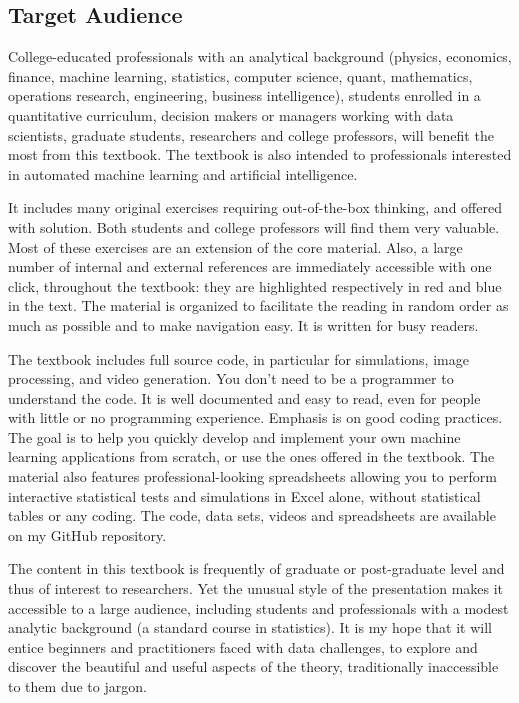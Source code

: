 \documentclass[10pt]{article}
\begin{document}
\subsection*{Target Audience}

College-educated professionals with an analytical background (physics, economics, finance, machine learning, statistics, computer science, quant, mathematics, operations research, engineering, business intelligence), students enrolled in a quantitative curriculum, decision makers or managers working with data scientists, graduate students, researchers and college professors, will benefit the most from this textbook. The textbook is also intended to professionals interested in automated machine learning and artificial intelligence.

It includes many original exercises requiring out-of-the-box thinking, and offered with solution. Both students and college professors will find them very valuable. Most of these exercises are an extension  of the core material.  Also, a large number of internal and external references are immediately accessible with one click, throughout the textbook: they are highlighted respectively in red and blue in the text. The material is organized to facilitate the reading in random order as much as possible and to make navigation easy. It is written for busy readers.

The textbook includes full source code, in particular for simulations, image processing, and video generation. You don't need to be a programmer to understand the code. It is well documented and easy to read, even for people with little or no programming experience. Emphasis is on good coding practices. The goal is to help you quickly  develop and implement your own machine learning applications from scratch, or use the ones offered in the textbook.
The material also features professional-looking spreadsheets allowing you to perform interactive statistical tests and simulations in Excel alone, without statistical tables or any coding. 
The code, data sets, videos and spreadsheets are available on my GitHub repository.  

The content in this textbook is frequently of graduate or post-graduate level and thus of interest to researchers. Yet the unusual style of the presentation makes it accessible to a large audience, including students and professionals with a modest analytic background (a standard course in statistics). It is my hope that it will entice beginners and practitioners faced with data challenges, to explore and discover the beautiful and useful aspects of the theory, traditionally inaccessible to them due to jargon. 
 
\end{document}
